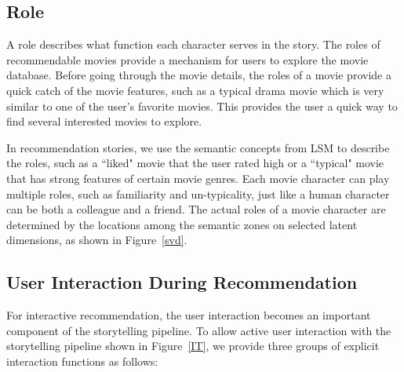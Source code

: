 \documentclass{vgtc}                          %
\begin{document}
\subsection{Role}

A role describes what function each character serves in the story.
The roles of recommendable movies provide a mechanism for users to explore the movie database. 
Before going through the movie details, the roles of a movie provide a quick catch of the movie features, such as a typical drama movie which is very similar to one of the user's favorite movies.
This provides the user a quick way to find several interested movies to explore.
 

In recommendation stories, we use the semantic concepts from LSM to describe the roles, such as a ``liked" movie that the user rated high or a ``typical" movie that has strong features of certain movie genres.
Each movie character can play multiple roles, such as familiarity and un-typicality, just like a human character can be both a colleague and a friend. 
The actual roles of a movie character are determined by the locations among the semantic zones on selected latent dimensions, as shown in Figure~\ref{svd}.


\subsection{User Interaction During Recommendation}

For interactive recommendation, the user interaction becomes an important component of the storytelling pipeline.
To allow active user interaction with the storytelling pipeline shown in Figure~\ref{IT}, we provide three groups of explicit interaction functions as follows:
\end{document}
